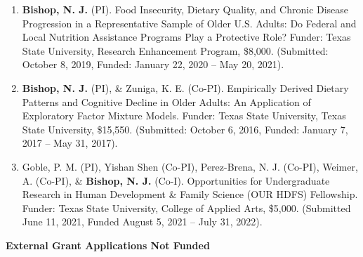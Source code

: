 \documentclass[
]{article}
\begin{document}
\begin{enumerate}
\def\labelenumi{\arabic{enumi}.}
\item
  \textbf{Bishop, N. J.} (PI). Food Insecurity, Dietary Quality, and
  Chronic Disease Progression in a Representative Sample of Older U.S.
  Adults: Do Federal and Local Nutrition Assistance Programs Play a
  Protective Role? Funder: Texas State University, Research Enhancement
  Program, \$8,000. (Submitted: October 8, 2019, Funded: January 22,
  2020 -- May 20, 2021).
\item
  \textbf{Bishop, N. J.} (PI), \& Zuniga, K. E. (Co-PI). Empirically
  Derived Dietary Patterns and Cognitive Decline in Older Adults: An
  Application of Exploratory Factor Mixture Models. Funder: Texas State
  University, Texas State University, \$15,550. (Submitted: October 6,
  2016, Funded: January 7, 2017 -- May 31, 2017).
\item
  Goble, P. M. (PI), Yishan Shen (Co-PI), Perez-Brena, N. J. (Co-PI),
  Weimer, A. (Co-PI), \& \textbf{Bishop, N. J.} (Co-I). Opportunities
  for Undergraduate Research in Human Development \& Family Science (OUR
  HDFS) Fellowship. Funder: Texas State University, College of Applied
  Arts, \$5,000. (Submitted June 11, 2021, Funded August 5, 2021 -- July
  31, 2022).
\end{enumerate}

\textbf{External Grant Applications Not Funded}
\end{document}

